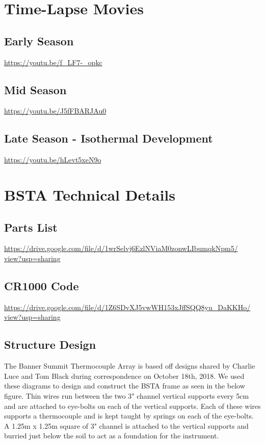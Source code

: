 

\newpage %
\chapter{Time-Lapse Movies} \newpage
\section{Early Season} 
\href{https://youtu.be/f_LF7-_opkc}{https://youtu.be/f\_LF7-\_opkc} 
\section{Mid Season} 
\href{https://youtu.be/J5fFBARJAu0}{https://youtu.be/J5fFBARJAu0}
\section{Late Season - Isothermal Development} 
\href{https://youtu.be/hLevt5xeN9o}{https://youtu.be/hLevt5xeN9o}

\chapter{BSTA Technical Details} \newpage
\section{Parts List}
\href{https://drive.google.com/file/d/1wrSelvj6EzlNViaM0zonwLIbumqkNpm5/view?usp=sharing}{https://drive.google.com/file/d/1wrSelvj6EzlNViaM0zonwLIbumqkNpm5/ \\ view?usp=sharing}
\section{CR1000 Code}
\href{https://drive.google.com/file/d/1Z6SDvXJ5vwWH153xJffSQQ8yu_DaKKHo/view?usp=sharing}{https://drive.google.com/file/d/1Z6SDvXJ5vwWH153xJffSQQ8yu_DaKKHo/ \\ view?usp=sharing}

\section{Structure Design}
The Banner Summit Thermocouple Array is based off designs shared by Charlie Luce and Tom Black during correspondence on October 18th, 2018. We used these diagrams to design and construct the BSTA frame as seen in the below figure. Thin wires run between the two 3" channel vertical supports every 5cm and are attached to eye-bolts on each of the vertical supports. Each of these wires supports a thermocouple and is kept taught by springs on each of the eye-bolts. A 1.25m x 1.25m square of 3" channel is attached to the vertical supports and burried just below the soil to act as a foundation for the instrument. 


